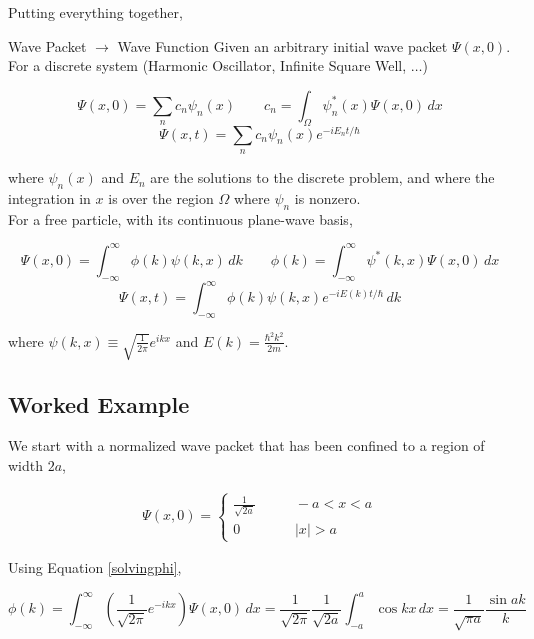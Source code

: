 Putting everything together, 

\begin{mainbox}{Wave Packet $\rightarrow$ Wave Function}
  Given an arbitrary initial wave packet $\Psi(x, 0)$. \\

  For a discrete system (Harmonic Oscillator, Infinite Square Well,  $\hdots$)

   \[
  \Psi(x, 0) = \sum_n c_n \psi_n(x) \qquad c_n = \int_\Omega \psi_n^*(x)\Psi(x,
  0) \, dx
  \] \[ \Psi(x, t) = \sum_n c_n \psi_n(x) e^{-iE_n t/\hbar} \] \vspace{3px}
  
where $\psi_n(x)$ and $E_n$ are the solutions to the discrete problem, and
where the integration in $x$ is over the region $\Omega$ where $\psi_n$ is
nonzero. \\

For a free particle, with its continuous plane-wave basis, 

\[ \Psi(x, 0) = \int_{-\infty}^{\infty} \phi(k)\psi(k, x) \, dk \qquad \phi(k)
= \int_{-\infty}^{\infty} \psi^*(k, x)\Psi(x, 0) \, dx \] \[ \Psi(x, t)
= \int_{-\infty}^{\infty} \phi(k)\psi(k, x) e^{-iE(k) t /\hbar} \, dk \]
\vspace{3px}
  
where $\psi(k, x) \equiv \sqrt{\frac{1}{2\pi}} e^{ikx}$ and $E(k)
= \frac{\hbar^2 k^2}{2m}$.
\end{mainbox}


\subsection{Worked Example} 

We start with a normalized wave packet that has been confined to a region of
width $2a$, 

\begin{align} \label{problemfree}
\Psi(x, 0) = \begin{cases}
  \frac{1}{\sqrt{2a}} &\qquad -a < x < a \\ 0 &\qquad |x| > a
\end{cases}
\end{align} \vspace{3px}

Using Equation \ref{solvingphi}, 

\[
  \phi(k) = \int_{-\infty}^{\infty} \left( \frac{1}{\sqrt{2\pi}}e^{-ikx}
  \right) \Psi(x, 0) \, dx = \frac{1}{\sqrt{2\pi}}\frac{1}{\sqrt{2a}}
  \int_{-a}^{a} \cos kx \, dx = \frac{1}{\sqrt{\pi a}} \frac{\sin ak}{k}
\] \vspace{3px}

